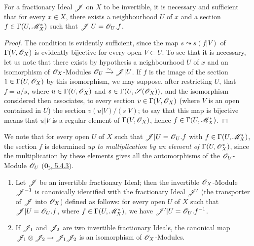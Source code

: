 \begin{proposition}[21.2.2]
\label{IV.21.2.2}
For a fractionary Ideal $\mathscr{J}$ on $X$ to be invertible, it is necessary and sufficient that for every $x\in X$, there exists a neighbourhood $U$ of $x$ and a section $f\in\Gamma(U,\mathscr{M}_X^*)$ such that $\mathscr{J}|U=\mathscr{O}_U.f$.
\end{proposition}

\begin{proof}
The condition is evidently sufficient, since the map $s\leadsto s(f|V)$ of $\Gamma(V,\mathscr{O}_X)$ is evidently bijective for every open $V\subset U$.
To see that it is necessary, let us note that there exists by hypothesis a neighbourhood $U$ of $x$ and an isomorphism of $\mathscr{O}_X$-Modules $\mathscr{O}_U\xrightarrow{\sim}\mathscr{J}|U$.
If $f$ is the image of the section $1\in\Gamma(U,\mathscr{O}_X)$ by this isomorphism, we may suppose, after restricting $U$, that $f=u/s$, where $u\in\Gamma(U,\mathscr{O}_X)$ and $s\in\Gamma(U,\mathscr{S}(\mathscr{O}_X))$, and the isomorphism considered then associates, to every section $v\in\Gamma(V,\mathscr{O}_X)$ (where $V$ is an open contained in $U$) the section $v(u|V)/(s|V)$;
to say that this map is bijective means that $u|V$ is a regular element of $\Gamma(V,\mathscr{O}_X)$, hence $f\in\Gamma(U,\mathscr{M}_X^*)$.
\end{proof}

We note that for every open $U$ of $X$ such that $\mathscr{J}|U=\mathscr{O}_U.f$ with $f\in\Gamma(U,\mathscr{M}_X^*)$, the section $f$ is determined \emph{up to multiplication by an element of} $\Gamma(U,\mathscr{O}_X^*)$, since the
multiplication by these elements gives all the automorphisms of the $\mathscr{O}_U$-Module $\mathscr{O}_U$ (\hyperref[0.5.4.3]{$\mathbf{0}_{\mathrm{I}}$, 5.4.3}).

\begin{corollary}[21.2.3]
\label{IV.21.2.3}
\begin{enumerate}[label=\textup{(\roman*)}]
  \item Let $\mathscr{J}$ be an invertible fractionary Ideal;
  then the invertible $\mathscr{O}_X$-Module $\mathscr{J}^{-1}$ is canonically identified with the fractionary Ideal $\mathscr{J}'$ (the transporter of $\mathscr{J}$ into $\mathscr{O}_X$) defined as follows:
  for every open $U$ of $X$ such that $\mathscr{J}|U=\mathscr{O}_U.f$, where $f\in\Gamma(U,\mathscr{M}_X^*)$, we have $\mathscr{J}'|U=\mathscr{O}_U.f^{-1}$.
  \item If $\mathscr{J}_1$ and $\mathscr{J}_2$ are two invertible fractionary Ideals, the canonical map $\mathscr{J}_1\otimes\mathscr{J}_2\to\mathscr{J}_1\mathscr{J}_2$ is an isomorphism of $\mathscr{O}_X$-Modules.
\end{enumerate}
\end{corollary}

